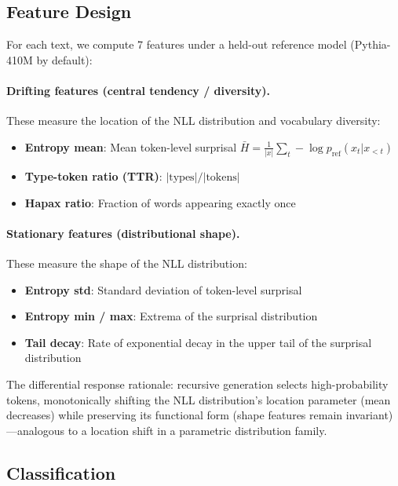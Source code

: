 \documentclass[11pt,a4paper]{article}
\begin{document}
\subsection{Feature Design}
\label{sec:features}

For each text, we compute 7 features under a held-out reference model (Pythia-410M by default):

\paragraph{Drifting features (central tendency / diversity).}
These measure the location of the NLL distribution and vocabulary diversity:
\begin{itemize}
    \item \textbf{Entropy mean}: Mean token-level surprisal $\bar{H} = \frac{1}{|x|}\sum_t -\log p_{\text{ref}}(x_t | x_{<t})$
    \item \textbf{Type-token ratio (TTR)}: $|\text{types}| / |\text{tokens}|$
    \item \textbf{Hapax ratio}: Fraction of words appearing exactly once
\end{itemize}

\paragraph{Stationary features (distributional shape).}
These measure the shape of the NLL distribution:
\begin{itemize}
    \item \textbf{Entropy std}: Standard deviation of token-level surprisal
    \item \textbf{Entropy min / max}: Extrema of the surprisal distribution
    \item \textbf{Tail decay}: Rate of exponential decay in the upper tail of the surprisal distribution
\end{itemize}

The differential response rationale: recursive generation selects high-probability tokens, monotonically shifting the NLL distribution's location parameter (mean decreases) while preserving its functional form (shape features remain invariant)---analogous to a location shift in a parametric distribution family.

\subsection{Classification}
\end{document}
